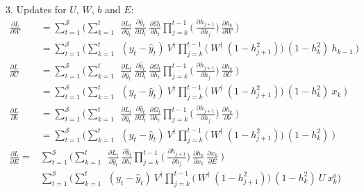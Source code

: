 \documentclass{article}
\begin{document}
3. Updates for $U$, $W$, $b$ and $E$:
\begin{align*}
    \frac{\partial L}{ \partial{W}} &= \sum_{t=1}^{\mathcal{S}} 
	\bigg(	
	 \sum_{k=1}^{t} ~
	~\frac{\partial L_t}{\partial \hat{y}_t}
        ~\frac{\partial \hat{y}_t}{\partial \Omega_t}
	~\frac{\partial \Omega_t}{\partial h_t}
        \prod_{j=k}^{t-1} \bigg(
	~\frac{\partial h_{j+1}}{\partial h_{j}}
        \bigg)
	~\frac{\partial h_k}{\partial W}~
	\bigg) \\
  &= \sum_{t=1}^{\mathcal{S}} 
	\bigg(	
	 \sum_{k=1}^{t} ~
	~(y_t - \hat{y}_t)
	~V^\dagger
        \prod_{j=k}^{t-1} \bigg(
	~W^\dagger ~ (1 - h_{j+1}^2)
        \bigg)
	~(1-h_k^2)~ h_{k-1}~
	\bigg) \\
     \frac{\partial L}{ \partial{U}} &= \sum_{t=1}^{\mathcal{S}} 
	\bigg(	
	 \sum_{k=1}^{t} ~
	~\frac{\partial L_t}{\partial \hat{y}_t}
        ~\frac{\partial \hat{y}_t}{\partial \Omega_t}
	~\frac{\partial \Omega_t}{\partial h_t}
        \prod_{j=k}^{t-1} \bigg(
	~\frac{\partial h_{j+1}}{\partial h_{j}}
        \bigg)
	~\frac{\partial h_k}{\partial U}~
	\bigg) \\
  &= \sum_{t=1}^{\mathcal{S}} 
	\bigg(	
	 \sum_{k=1}^{t} ~
	~(y_t - \hat{y}_t)
	~V^\dagger
        \prod_{j=k}^{t-1} \bigg(
	~W^\dagger ~ (1 - h_{j+1}^2)
        \bigg)
	~(1-h_k^2)~ x_{k}~
	\bigg) \\
     \frac{\partial L}{ \partial{b}} &= \sum_{t=1}^{\mathcal{S}} 
	\bigg(	
	 \sum_{k=1}^{t} ~
	~\frac{\partial L_t}{\partial \hat{y}_t}
        ~\frac{\partial \hat{y}_t}{\partial \Omega_t}
	~\frac{\partial \Omega_t}{\partial h_t}
        \prod_{j=k}^{t-1} \bigg(
	~\frac{\partial h_{j+1}}{\partial h_{j}}
        \bigg)
	~\frac{\partial h_k}{\partial b}~
	\bigg) \\
  &= \sum_{t=1}^{\mathcal{S}} 
	\bigg(	
	 \sum_{k=1}^{t} ~
	~(y_t - \hat{y}_t)
	~V^\dagger
        \prod_{j=k}^{t-1} \bigg(
	~W^\dagger ~ (1 - h_{j+1}^2)
        \bigg)
	~(1-h_k^2)~
	\bigg) \\
 \frac{\partial L}{ \partial{E}} = &\sum_{t=1}^{\mathcal{S}} 
	\bigg(	
	 \sum_{k=1}^{t} ~
	~\frac{\partial L_t}{\partial \hat{y}_t}
	~\frac{\partial \hat{y}_t}{\partial h_t}
        \prod_{j=k}^{t-1} \bigg(
	~\frac{\partial h_{j+1}}{\partial h_{j}}
        \bigg)
	~\frac{\partial h_k}{\partial x_k}~\frac{\partial x_k}{\partial E}~
	\bigg) \\
 &\sum_{t=1}^{\mathcal{S}} 
	\bigg(	
	 \sum_{k=1}^{t} ~
	~(y_t - \hat{y}_t)
	~V^\dagger
        \prod_{j=k}^{t-1} \bigg(
	~W^\dagger ~ (1 - h_{j+1}^2)
        \bigg)
	~(1-h_k^2)~ U~ x^o_k
	\bigg) 
\end{align*}    
\end{document}
